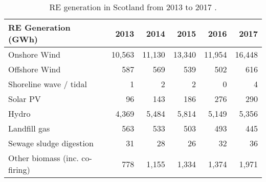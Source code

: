 \begin{table}[H]
	\caption{RE generation in Scotland from 2013 to 2017 \citep{BEIS2018REs}.}
	\label{tbl:RE_gen}
	\centering
	\begin{tabular}{@{}lrrrrr@{}}
		\toprule
		RE Generation (GWh) & 2013 & 2014 & 2015 & 2016 & 2017 \\ \midrule
		Onshore Wind & 10,563 & 11,130 & 13,340 & 11,954 & 16,448 \\
		Offshore Wind & 587 & 569 & 539 & 502 & 616 \\
		Shoreline wave / tidal & 1 & 2 & 2 & 0 & 4 \\
		Solar PV & 96 & 143 & 186 & 276 & 290 \\
		Hydro & 4,369 & 5,484 & 5,814 & 5,149 & 5,356 \\
		Landfill gas & 563 & 533 & 503 & 493 & 445 \\
		Sewage sludge digestion & 31 & 28 & 26 & 32 & 36 \\
		Other biomass (inc. co-firing) & 778 & 1,155 & 1,334 & 1,374 & 1,971 \\ \bottomrule
	\end{tabular}
\end{table}